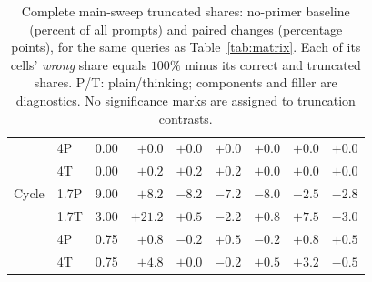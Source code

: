 \begin{table}[t]
\begin{tabular}{llrrrrrrr}
 & 4P & 0.00 & $+0.0$ & $+0.0$ & $+0.0$ & $+0.0$ & $+0.0$ & $+0.0$\\ %
 & 4T & 0.00 & $+0.2$ & $+0.2$ & $+0.2$ & $+0.0$ & $+0.0$ & $+0.0$\\ %
\addlinespace[2pt]
Cycle & 1.7P & 9.00 & $+8.2$ & $-8.2$ & $-7.2$ & $-8.0$ & $-2.5$ & $-2.8$\\ %
 & 1.7T & 3.00 & $+21.2$ & $+0.5$ & $-2.2$ & $+0.8$ & $+7.5$ & $-3.0$\\ %
 & 4P & 0.75 & $+0.8$ & $-0.2$ & $+0.5$ & $-0.2$ & $+0.8$ & $+0.5$\\ %
 & 4T & 0.75 & $+4.8$ & $+0.0$ & $-0.2$ & $+0.5$ & $+3.2$ & $-0.5$\\ %
\bottomrule
\end{tabular}
\caption{Complete main-sweep truncated shares: no-primer baseline (percent of all prompts) and paired changes (percentage points), for the same queries as Table~\ref{tab:matrix}. Each of its cells' \emph{wrong} share equals $100\%$ minus its correct and truncated shares. P/T: plain/thinking; components and filler are diagnostics. No significance marks are assigned to truncation contrasts.} %
\label{tab:truncmatrix}
\end{table}
